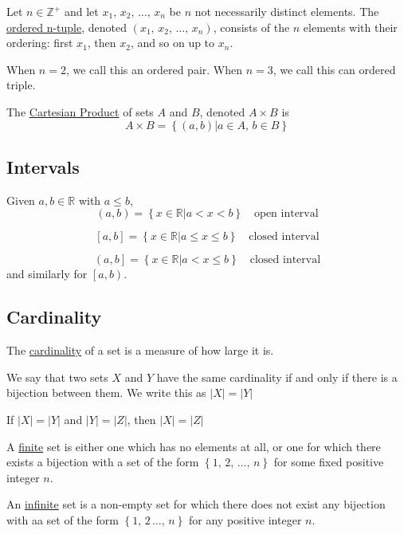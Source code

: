 \begin{definition}
    Let $n\in\mathbb Z^+$ and let $x_1,\,x_2,\,\dots,\,x_n$ be $n$ not necessarily distinct elements. The \underline{ordered n-tuple}, denoted $\left(x_1,\,x_2,\,\dots,\,x_n\right)$, consists of the $n$ elements with their ordering: first $x_1$, then $x_2$, and so on up to $x_n$.

    When $n=2$, we call this an ordered pair. When $n=3$, we call this can ordered triple.
\end{definition}

\begin{definition}
    The \underline{Cartesian Product} of sets $A$ and $B$, denoted $A\times B$ is $$A\times B = \left\{\left(a,b\right) | a\in A,\, b\in B\right\}$$
\end{definition}

\subsection{Intervals}
Given $a,b\in\mathbb R$ with $a\leq b$,
$$\left(a,b\right) = \left\{x\in\mathbb R | a < x < b\right\} \quad\text{open interval}$$

$$\left[a,b\right] = \left\{x\in\mathbb R | a \leq x \leq b\right\} \quad\text{closed interval}$$

$$\left(a,b\right] = \left\{x\in\mathbb R | a < x \leq b\right\} \quad\text{closed interval}$$ and similarly for $\left[a,b\right)$.

\subsection{Cardinality}
\begin{definition}
    The \underline{cardinality} of a set is a measure of how large it is.

    We say that two sets $X$ and $Y$ have the same cardinality if and only if there is a bijection between them. We write this as $|X| = |Y|$
\end{definition}

If $|X| = |Y|$ and $|Y| = |Z|$, then $|X| = |Z|$

A \underline{finite} set is either one which has no elements at all, or one for which there exists a bijection with a set of the form $\left\{1,\,2,\,\dots,\,n\right\}$ for some fixed positive integer $n$.

An \underline{infinite} set is a non-empty set for which there does not exist any bijection with aa set of the form $\left\{1,\,2\,\dots,\,n\right\}$ for any positive integer $n$.

